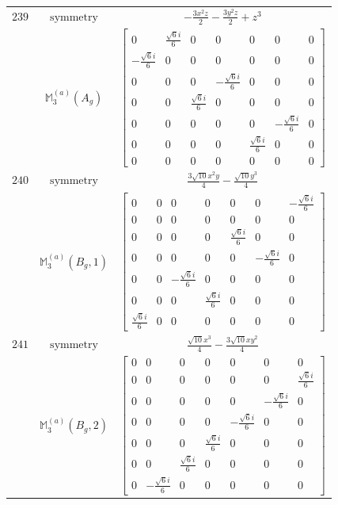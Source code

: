 \documentclass[fleqn,8pt,landscape]{jsarticle}
\begin{document}
\begin{longtable}{ccc}
$ 239 $ & $ \text{symmetry} $ & $ - \frac{3 x^{2} z}{2} - \frac{3 y^{2} z}{2} + z^{3} $ \\
$  $ & $ \mathbb{M}_{3}^{(a)}(A_{g}) $ & $ \begin{bmatrix} 0 & \frac{\sqrt{6} i}{6} & 0 & 0 & 0 & 0 & 0 \\ - \frac{\sqrt{6} i}{6} & 0 & 0 & 0 & 0 & 0 & 0 \\ 0 & 0 & 0 & - \frac{\sqrt{6} i}{6} & 0 & 0 & 0 \\ 0 & 0 & \frac{\sqrt{6} i}{6} & 0 & 0 & 0 & 0 \\ 0 & 0 & 0 & 0 & 0 & - \frac{\sqrt{6} i}{6} & 0 \\ 0 & 0 & 0 & 0 & \frac{\sqrt{6} i}{6} & 0 & 0 \\ 0 & 0 & 0 & 0 & 0 & 0 & 0 \end{bmatrix} $ \\ \hline
$ 240 $ & $ \text{symmetry} $ & $ \frac{3 \sqrt{10} x^{2} y}{4} - \frac{\sqrt{10} y^{3}}{4} $ \\
$  $ & $ \mathbb{M}_{3}^{(a)}(B_{g},1) $ & $ \begin{bmatrix} 0 & 0 & 0 & 0 & 0 & 0 & - \frac{\sqrt{6} i}{6} \\ 0 & 0 & 0 & 0 & 0 & 0 & 0 \\ 0 & 0 & 0 & 0 & \frac{\sqrt{6} i}{6} & 0 & 0 \\ 0 & 0 & 0 & 0 & 0 & - \frac{\sqrt{6} i}{6} & 0 \\ 0 & 0 & - \frac{\sqrt{6} i}{6} & 0 & 0 & 0 & 0 \\ 0 & 0 & 0 & \frac{\sqrt{6} i}{6} & 0 & 0 & 0 \\ \frac{\sqrt{6} i}{6} & 0 & 0 & 0 & 0 & 0 & 0 \end{bmatrix} $ \\ \hline
$ 241 $ & $ \text{symmetry} $ & $ \frac{\sqrt{10} x^{3}}{4} - \frac{3 \sqrt{10} x y^{2}}{4} $ \\
$  $ & $ \mathbb{M}_{3}^{(a)}(B_{g},2) $ & $ \begin{bmatrix} 0 & 0 & 0 & 0 & 0 & 0 & 0 \\ 0 & 0 & 0 & 0 & 0 & 0 & \frac{\sqrt{6} i}{6} \\ 0 & 0 & 0 & 0 & 0 & - \frac{\sqrt{6} i}{6} & 0 \\ 0 & 0 & 0 & 0 & - \frac{\sqrt{6} i}{6} & 0 & 0 \\ 0 & 0 & 0 & \frac{\sqrt{6} i}{6} & 0 & 0 & 0 \\ 0 & 0 & \frac{\sqrt{6} i}{6} & 0 & 0 & 0 & 0 \\ 0 & - \frac{\sqrt{6} i}{6} & 0 & 0 & 0 & 0 & 0 \end{bmatrix} $ \\ \hline

\end{longtable}
\end{document}
